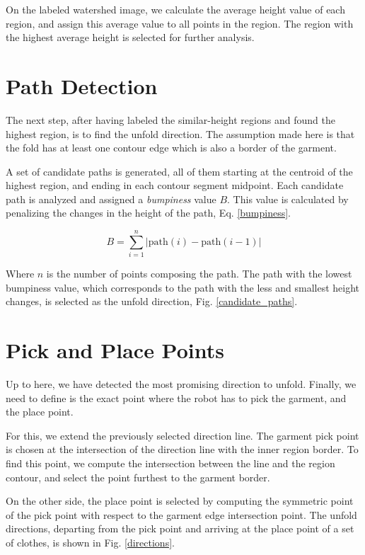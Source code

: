 On the labeled watershed image, we calculate the average height value of each region, and assign this average value to all points in the region. The region with the highest average height is selected for further analysis. 

\section{Path Detection}

The next step, after having labeled the similar-height regions and found the highest region, is to find the unfold direction. The assumption made here is that the fold has at least one contour edge which is also a border of the garment. 

A set of candidate paths is generated, all of them starting at the centroid of the highest region, and ending in each contour segment midpoint. Each candidate path is analyzed and assigned a \textit{bumpiness} value $B$. This value is calculated by penalizing the changes in the height of the path, Eq. \eqref{bumpiness}.

\begin{equation}\label{bumpiness}
B = \sum_{i=1}^{n} | \textrm{path}(i)- \textrm{path}(i-1) | 
\end{equation}

Where $n$ is the number of points composing the path. The path with the lowest bumpiness value, which corresponds to the path with the less and smallest height changes, is selected as the unfold direction, Fig. \ref{candidate_paths}.


\section{Pick and Place Points}

Up to here, we have detected the most promising direction to unfold. Finally, we need to define is the exact point where the robot has to pick the garment, and the place point. 

For this, we extend the previously selected direction line. The garment pick point is chosen at the intersection of the direction line with the inner region border. To find this point, we compute the intersection between the line and the region contour, and select the point furthest to the garment border.

On the other side, the place point is selected by computing the symmetric point of the pick point with respect to the garment edge intersection point. The unfold directions, departing from the pick point and arriving at the place point of a set of clothes, is shown in Fig. \ref{directions}.
